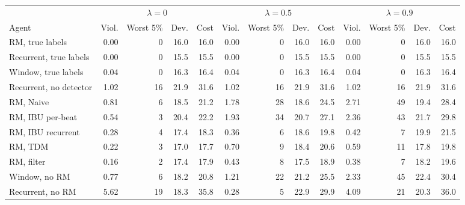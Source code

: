 \begin{tabular}{lrrrrrrrrrrrr}
\toprule
 & \multicolumn{4}{c}{$\lambda=0$} & \multicolumn{4}{c}{$\lambda=0.5$} & \multicolumn{4}{c}{$\lambda=0.9$} \\
Agent & Viol. & Worst 5\% & Dev. & Cost & Viol. & Worst 5\% & Dev. & Cost & Viol. & Worst 5\% & Dev. & Cost \\
\midrule
RM, true labels & 0.00 & 0 & 16.0 & 16.0 & 0.00 & 0 & 16.0 & 16.0 & 0.00 & 0 & 16.0 & 16.0 \\
Recurrent, true labels & 0.00 & 0 & 15.5 & 15.5 & 0.00 & 0 & 15.5 & 15.5 & 0.00 & 0 & 15.5 & 15.5 \\
Window, true labels & 0.04 & 0 & 16.3 & 16.4 & 0.04 & 0 & 16.3 & 16.4 & 0.04 & 0 & 16.3 & 16.4 \\
Recurrent, no detector & 1.02 & 16 & 21.9 & 31.6 & 1.02 & 16 & 21.9 & 31.6 & 1.02 & 16 & 21.9 & 31.6 \\
RM, Naive & 0.81 & 6 & 18.5 & 21.2 & 1.78 & 28 & 18.6 & 24.5 & 2.71 & 49 & 19.4 & 28.4 \\
RM, IBU per-beat & 0.54 & 3 & 20.4 & 22.2 & 1.93 & 34 & 20.7 & 27.1 & 2.36 & 43 & 21.7 & 29.8 \\
RM, IBU recurrent & 0.28 & 4 & 17.4 & 18.3 & 0.36 & 6 & 18.6 & 19.8 & 0.42 & 7 & 19.9 & 21.5 \\
RM, TDM & 0.22 & 3 & 17.0 & 17.7 & 0.70 & 9 & 18.4 & 20.6 & 0.59 & 11 & 17.8 & 19.8 \\
RM, filter & 0.16 & 2 & 17.4 & 17.9 & 0.43 & 8 & 17.5 & 18.9 & 0.38 & 7 & 18.2 & 19.6 \\
Window, no RM & 0.77 & 6 & 18.2 & 20.8 & 1.21 & 22 & 21.2 & 25.5 & 2.33 & 45 & 22.4 & 30.4 \\
Recurrent, no RM & 5.62 & 19 & 18.3 & 35.8 & 0.28 & 5 & 22.9 & 29.9 & 4.09 & 21 & 20.3 & 36.0 \\
\bottomrule
\end{tabular}
